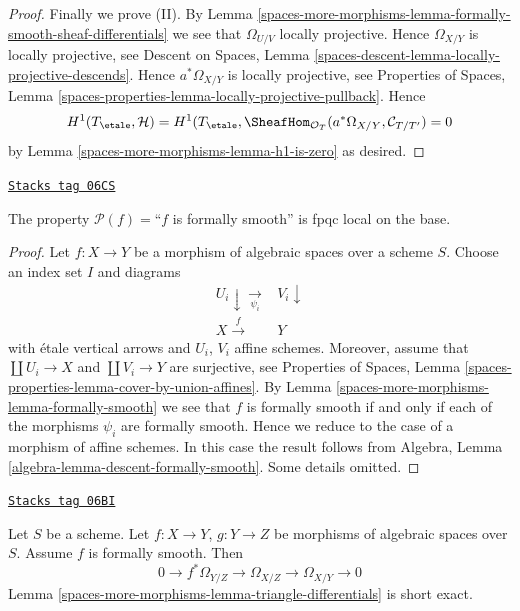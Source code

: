 \begin{proof}
\medskip\noindent
Finally we prove (II). By
Lemma \ref{spaces-more-morphisms-lemma-formally-smooth-sheaf-differentials}
we see that $\Omega_{U/V}$ locally projective.
Hence $\Omega_{X/Y}$ is locally projective, see
Descent on Spaces,
Lemma \ref{spaces-descent-lemma-locally-projective-descends}.
Hence $a^*\Omega_{X/Y}$ is locally projective, see
Properties of Spaces, Lemma
\ref{spaces-properties-lemma-locally-projective-pullback}.
Hence
$$
H^1(T_\etale, \mathcal{H}) =
H^1(T_\etale,
\SheafHom_{\mathcal{O}_T}(a^*\Omega_{X/Y}, \mathcal{C}_{T/T'}) = 0
$$
by
Lemma \ref{spaces-more-morphisms-lemma-h1-is-zero}
as desired.
\end{proof}

\begin{lemma}
\label{spaces-more-morphisms-lemma-descending-property-formally-smooth}
\href{https://stacks.math.columbia.edu/tag/06CS}{\texttt{Stacks tag 06CS}}

The property $\mathcal{P}(f) =$``$f$ is formally smooth''
is fpqc local on the base.
\end{lemma}

\begin{proof}
Let $f : X \to Y$ be a morphism of algebraic spaces over a scheme $S$.
Choose an index set $I$ and diagrams
$$
\begin{array}{cc}U_i \downarrow\underset{\psi_i}{\longrightarrow} & V_i \downarrow \\ X \overset{f}{\longrightarrow} & Y\end{array}
$$
with \'etale vertical arrows and $U_i$, $V_i$ affine schemes. Moreover,
assume that $\coprod U_i \to X$ and $\coprod V_i \to Y$ are surjective, see
Properties of Spaces,
Lemma \ref{spaces-properties-lemma-cover-by-union-affines}.
By
Lemma \ref{spaces-more-morphisms-lemma-formally-smooth}
we see that $f$ is formally smooth if and only if each of the morphisms
$\psi_i$ are formally smooth. Hence we reduce to the case of a morphism
of affine schemes. In this case the result follows from
Algebra, Lemma \ref{algebra-lemma-descent-formally-smooth}.
Some details omitted.
\end{proof}

\begin{lemma}
\label{spaces-more-morphisms-lemma-triangle-differentials-formally-smooth}
\href{https://stacks.math.columbia.edu/tag/06BI}{\texttt{Stacks tag 06BI}}

Let $S$ be a scheme.
Let $f : X \to Y$, $g : Y \to Z$ be morphisms of algebraic spaces over $S$.
Assume $f$ is formally smooth. Then
$$
0 \to f^*\Omega_{Y/Z} \to \Omega_{X/Z} \to \Omega_{X/Y} \to 0
$$
Lemma \ref{spaces-more-morphisms-lemma-triangle-differentials}
is short exact.
\end{lemma}

